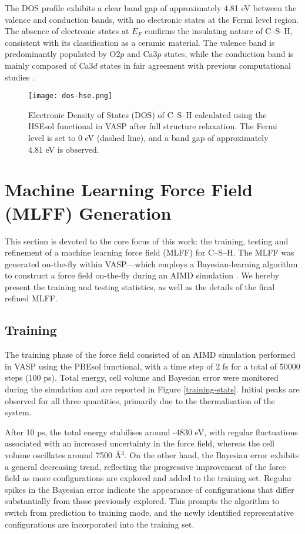 The DOS profile exhibits a clear band gap of approximately 4.81 eV between the valence and conduction bands, with no electronic states at the Fermi level region. The absence of electronic states at $E_F$ confirms the insulating nature of C--S--H, consistent with its classification as a ceramic material. The valence band is predominantly populated by O2$p$ and Ca3$p$ states, while the conduction band is mainly composed of Ca3$d$ states in fair agreement with previous computational studies \cite{Dharmawardhana2018}. 
\begin{figure}[H]
    \centering
    \texttt{[image: dos-hse.png]}
    \caption{
        Electronic Density of States (DOS) of C--S--H calculated using the HSEsol functional in VASP after full structure relaxation. The Fermi level is set to 0 eV (dashed line), and a band gap of approximately 4.81 eV is observed. 
    }
    \label{dos}
\end{figure}

\section{Machine Learning Force Field (MLFF) Generation}
\label{sec:mlff-training}
This section is devoted to the core focus of this work: the training, testing and refinement of a machine learning force field (MLFF) for C--S--H. The MLFF was generated on-the-fly within VASP---which employs a Bayesian-learning algorithm to construct a force field on-the-fly during an AIMD simulation \cite{zotero-item-773}. We hereby present the training and testing statistics, as well as the details of the final refined MLFF. 
\subsection{Training}
The training phase of the force field consisted of an AIMD simulation performed in VASP using the PBEsol functional, with a time step of 2 fs for a total of 50000 steps (100 ps). Total energy, cell volume and Bayesian error were monitored during the simulation and are reported in Figure \ref{training-stats}. Initial peaks are observed for all three quantities, primarily due to the thermalisation of the system.

After 10 ps, the total energy stabilises around -4830 eV, with regular fluctuations associated with an increased uncertainty in the force field, whereas the cell volume oscillates around 7500 \AA$^3$. On the other hand, the Bayesian error exhibits a general decreasing trend, reflecting the progressive improvement of the force field as more configurations are explored and added to the training set. Regular spikes in the Bayesian error indicate the appearance of configurations that differ substantially from those previously explored. This prompts the algorithm to switch from prediction to training mode, and the newly identified representative configurations are incorporated into the training set. 

